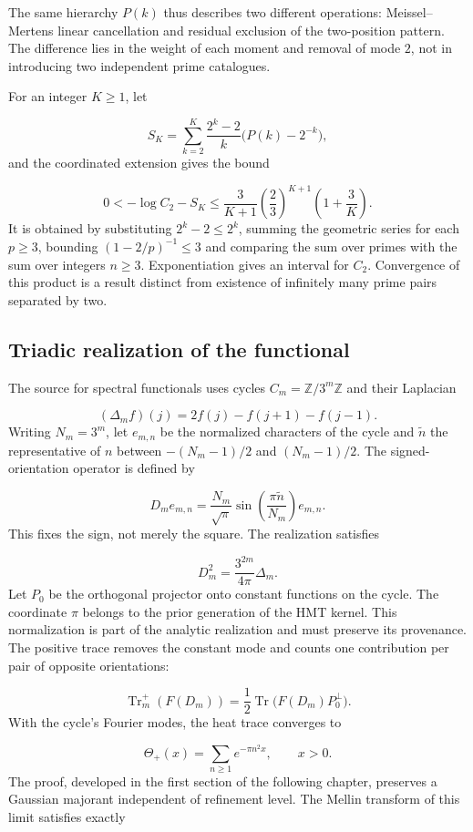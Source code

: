 The same hierarchy $P(k)$ thus describes two different operations: Meissel–Mertens linear cancellation and residual exclusion of the two-position pattern. The difference lies in the weight of each moment and removal of mode $2$, not in introducing two independent prime catalogues.

For an integer \(K\ge1\), let

\[
S_K=\sum_{k=2}^K\frac{2^k-2}{k}\bigl(P(k)-2^{-k}\bigr),
\]
and the coordinated extension gives the bound

\[
0<-\log C_2-S_K
\le\frac3{K+1}\left(\frac23\right)^{K+1}\left(1+\frac3K\right).
\]
It is obtained by substituting $2^k-2\le2^k$, summing the geometric series for each $p\ge3$, bounding $(1-2/p)^{-1}\le3$ and comparing the sum over primes with the sum over integers $n\ge3$. Exponentiation gives an interval for $C_2$. Convergence of this product is a result distinct from existence of infinitely many prime pairs separated by two.

\subsection{Triadic realization of the functional}
The source for spectral functionals uses cycles $C_m=\mathbb Z/3^m\mathbb Z$ and their Laplacian

\[
(\Delta_mf)(j)=2f(j)-f(j+1)-f(j-1).
\]
Writing \(N_m=3^m\), let \(e_{m,n}\) be the normalized characters of the cycle and \(\widetilde n\) the representative of \(n\) between \(-(N_m-1)/2\) and \((N_m-1)/2\). The signed-orientation operator is defined by

\[
D_m e_{m,n}=\frac{N_m}{\sqrt{\pi}}
\sin\left(\frac{\pi\widetilde n}{N_m}\right)e_{m,n}.
\]
This fixes the sign, not merely the square. The realization satisfies

\[
D_m^2=\frac{3^{2m}}{4\pi}\Delta_m.
\]
Let \(P_0\) be the orthogonal projector onto constant functions on the cycle. The coordinate $\pi$ belongs to the prior generation of the HMT kernel. This normalization is part of the analytic realization and must preserve its provenance. The positive trace removes the constant mode and counts one contribution per pair of opposite orientations:

\[
\operatorname{Tr}_m^+(F(D_m))
=\frac12\operatorname{Tr}\bigl(F(D_m)P_0^\perp\bigr).
\]
With the cycle's Fourier modes, the heat trace converges to

\[
\Theta_+(x)=\sum_{n\ge1}e^{-\pi n^2x},\qquad x>0.
\]
The proof, developed in the first section of the following chapter, preserves a Gaussian majorant independent of refinement level. The Mellin transform of this limit satisfies exactly

